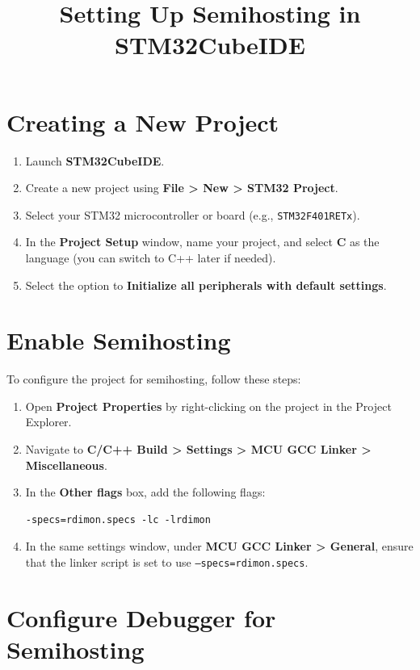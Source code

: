 \documentclass{article}
\begin{document}
\title{Setting Up Semihosting in STM32CubeIDE}
\author{}
\date{}
\maketitle

\section{Creating a New Project}

\begin{enumerate}
  \item Launch \textbf{STM32CubeIDE}.
  \item Create a new project using \textbf{File > New > STM32 Project}.
  \item Select your STM32 microcontroller or board (e.g., \texttt{STM32F401RETx}).
  \item In the \textbf{Project Setup} window, name your project, and select \textbf{C} as the language (you can switch to C++ later if needed).
  \item Select the option to \textbf{Initialize all peripherals with default settings}.
\end{enumerate}

\section{Enable Semihosting}

To configure the project for semihosting, follow these steps:

\begin{enumerate}
  \item Open \textbf{Project Properties} by right-clicking on the project in the Project Explorer.
  \item Navigate to \textbf{C/C++ Build > Settings > MCU GCC Linker > Miscellaneous}.
  \item In the \textbf{Other flags} box, add the following flags:
  \begin{lstlisting}
-specs=rdimon.specs -lc -lrdimon
  \end{lstlisting}
  \item In the same settings window, under \textbf{MCU GCC Linker > General}, ensure that the linker script is set to use \texttt{--specs=rdimon.specs}.
\end{enumerate}

\section{Configure Debugger for Semihosting}
\end{document}
